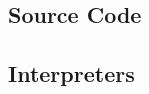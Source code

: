 \begin{appendices}
\lstset{style=appendix}
\makeatletter
{}
\makeatother
  \chapter{Source Code}
  \section{Interpreters}
  \label{app:interpreters}
  

  
  

\end{appendices}

